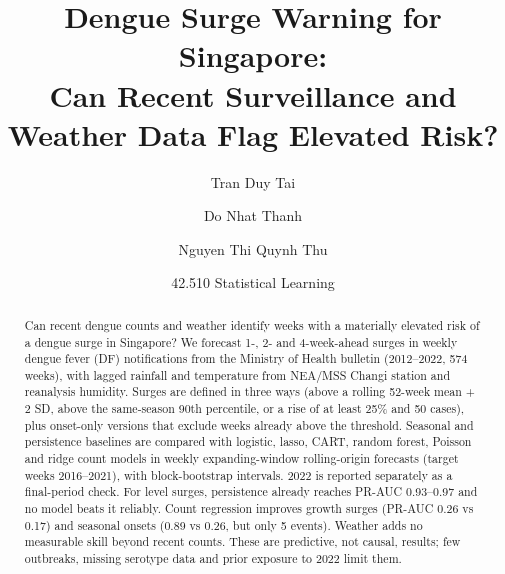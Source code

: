 \documentclass[11pt,a4paper]{article}
\title{Dengue Surge Warning for Singapore:\\
Can Recent Surveillance and Weather Data Flag Elevated Risk?}
\author{Tran Duy Tai \and Do Nhat Thanh \and Nguyen Thi Quynh Thu}
\date{42.510 Statistical Learning}
\begin{document}
\maketitle

\begin{abstract}
Can recent dengue counts and weather identify weeks with a materially elevated risk of a dengue
surge in Singapore? We forecast 1-, 2- and 4-week-ahead surges in weekly dengue fever (DF)
notifications from the Ministry of Health bulletin (2012--2022, 574 weeks), with lagged rainfall
and temperature from NEA/MSS Changi station and reanalysis humidity. Surges are defined in three
ways (above a rolling 52-week mean + 2 SD, above the same-season 90th percentile, or a rise of at
least 25\% and 50 cases), plus onset-only versions that exclude weeks already above the threshold.
Seasonal and persistence baselines are compared with logistic, lasso, CART, random forest, Poisson
and ridge count models in weekly expanding-window rolling-origin forecasts (target weeks
2016--2021), with block-bootstrap intervals. 2022 is reported separately as a final-period check.
For level surges, persistence already reaches PR-AUC 0.93--0.97 and no model beats it reliably.
Count regression improves growth surges (PR-AUC 0.26 vs 0.17) and seasonal onsets (0.89 vs 0.26,
but only 5 events). Weather adds no measurable skill beyond recent counts. These are predictive,
not causal, results; few outbreaks, missing serotype data and prior exposure to 2022 limit them.
\end{abstract}












\end{document}
